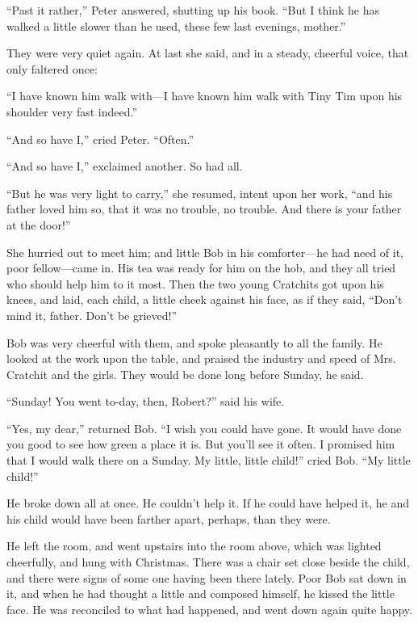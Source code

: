 \documentclass[paper=5.5in:8.5in,BCOR=15mm,twoside,DIV=15,headinclude=off,12pt,chapterprefix=off,openany,headings=huge]{scrbook} %
\begin{document}
\enquote{Past it rather,} Peter answered, shutting up his book. \enquote{But I think he has walked a little slower than he used, these few last evenings, mother.}

They were very quiet again. At last she said, and in a steady, cheerful voice, that only faltered once:

\enquote{I have known him walk with—I have known him walk with Tiny Tim upon his shoulder very fast indeed.}

\enquote{And so have I,} cried Peter. \enquote{Often.}

\enquote{And so have I,} exclaimed another. So had all.

\enquote{But he was very light to carry,} she resumed, intent upon her work, \enquote{and his father loved him so, that it was no trouble, no trouble. And there is your father at the door!}

She hurried out to meet him; and little Bob in his comforter—he had need of it, poor fellow—came in. His tea was ready for him on the hob, and they all tried who should help him to it most. Then the two young Cratchits got upon his knees, and laid, each child, a little cheek against his face, as if they said, \enquote{Don't mind it, father. Don't be grieved!}

Bob was very cheerful with them, and spoke pleasantly to all the family. He looked at the work upon the table, and praised the industry and speed of Mrs. Cratchit and the girls. They would be done long before Sunday, he said.

\enquote{Sunday! You went to-day, then, Robert?} said his wife.

\enquote{Yes, my dear,} returned Bob. \enquote{I wish you could have gone. It would have done you good to see how green a place it is. But you'll see it often. I promised him that I would walk there on a Sunday. My little, little child!} cried Bob. \enquote{My little child!}

He broke down all at once. He couldn't help it. If he could have helped it, he and his child would have been farther apart, perhaps, than they were.

He left the room, and went upstairs into the room above, which was lighted cheerfully, and hung with Christmas. There was a chair set close beside the child, and there were signs of some one having been there lately. Poor Bob sat down in it, and when he had thought a little and composed himself, he kissed the little face. He was reconciled to what had happened, and went down again quite happy.
\end{document}
